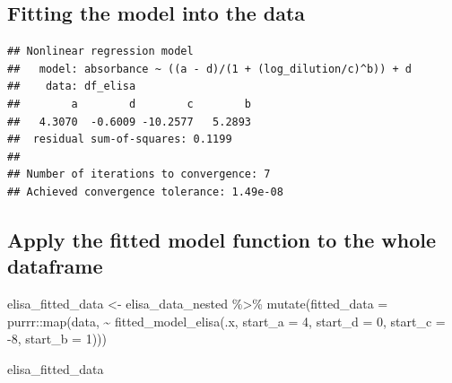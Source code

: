 \documentclass[
]{book}
\newenvironment{Shaded}{\begin{snugshade}}{\end{snugshade}}
\newcommand{\AttributeTok}[1]{\textcolor[rgb]{0.77,0.63,0.00}{#1}}
\newcommand{\DecValTok}[1]{\textcolor[rgb]{0.00,0.00,0.81}{#1}}
\newcommand{\FunctionTok}[1]{\textcolor[rgb]{0.00,0.00,0.00}{#1}}
\newcommand{\NormalTok}[1]{#1}
\newcommand{\OtherTok}[1]{\textcolor[rgb]{0.56,0.35,0.01}{#1}}
\newcommand{\SpecialCharTok}[1]{\textcolor[rgb]{0.00,0.00,0.00}{#1}}
\begin{document}
\hypertarget{fitting-the-model-into-the-data}{%
\subsection{Fitting the model into the data}\label{fitting-the-model-into-the-data}}

\begin{Shaded}
\end{Shaded}

\begin{verbatim}
## Nonlinear regression model
##   model: absorbance ~ ((a - d)/(1 + (log_dilution/c)^b)) + d
##    data: df_elisa
##        a        d        c        b 
##   4.3070  -0.6009 -10.2577   5.2893 
##  residual sum-of-squares: 0.1199
## 
## Number of iterations to convergence: 7 
## Achieved convergence tolerance: 1.49e-08
\end{verbatim}

\hypertarget{apply-the-fitted-model-function-to-the-whole-dataframe}{%
\subsection{Apply the fitted model function to the whole dataframe}\label{apply-the-fitted-model-function-to-the-whole-dataframe}}

\begin{Shaded}
\begin{Highlighting}[]
\NormalTok{elisa\_fitted\_data }\OtherTok{\textless{}{-}}\NormalTok{ elisa\_data\_nested }\SpecialCharTok{\%\textgreater{}\%}
  \FunctionTok{mutate}\NormalTok{(}\AttributeTok{fitted\_data =}\NormalTok{ purrr}\SpecialCharTok{::}\FunctionTok{map}\NormalTok{(data, }\SpecialCharTok{\textasciitilde{}} \FunctionTok{fitted\_model\_elisa}\NormalTok{(.x, }\AttributeTok{start\_a =} \DecValTok{4}\NormalTok{, }\AttributeTok{start\_d =} \DecValTok{0}\NormalTok{, }\AttributeTok{start\_c =} \SpecialCharTok{{-}}\DecValTok{8}\NormalTok{, }\AttributeTok{start\_b =} \DecValTok{1}\NormalTok{)))}

\NormalTok{elisa\_fitted\_data}
\end{Highlighting}
\end{Shaded}
\end{document}
